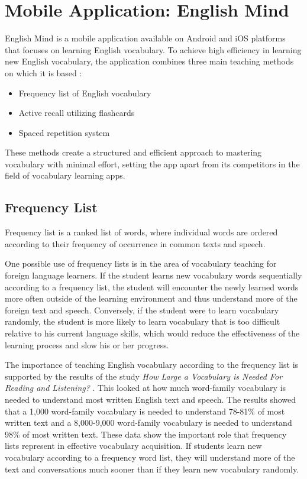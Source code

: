 \chapter{Mobile Application: English Mind}
\label{chap:mobile-application-english-mind}

English Mind is a mobile application available on Android \cite{cite:english_mind_play_store} and iOS \cite{cite:english_mind_app_store} platforms that focuses on learning English vocabulary. To achieve high efficiency in learning new English vocabulary, the application combines three main teaching methods on which it is based \cite{cite:english_mind_website}:

\begin{itemize}
    \item Frequency list of English vocabulary
    \item Active recall utilizing flashcards
    \item Spaced repetition system
\end{itemize}

These methods create a structured and efficient approach to mastering vocabulary with minimal effort, setting the app apart from its competitors in the field of vocabulary learning apps.

\section{Frequency List}

Frequency list is a ranked list of words, where individual words are ordered according to their frequency of occurrence in common texts and speech. 

One possible use of frequency lists is in the area of vocabulary teaching for foreign language learners. If the student learns new vocabulary words sequentially according to a frequency list, the student will encounter the newly learned words more often outside of the learning environment and thus understand more of the foreign text and speech. Conversely, if the student were to learn vocabulary randomly, the student is more likely to learn vocabulary that is too difficult relative to his current language skills, which would reduce the effectiveness of the learning process and slow his or her progress.

The importance of teaching English vocabulary according to the frequency list is supported by the results of the study \textit{How Large a Vocabulary is Needed For Reading and Listening?} \cite{cite:nation2006_how_large_vocabulary_is_needed}. This looked at how much word-family vocabulary is needed to understand most written English text and speech. The results showed that a 1,000 word-family vocabulary is needed to understand 78-81\% of most written text and a 8,000-9,000 word-family vocabulary is needed to understand 98\% of most written text. These data show the important role that frequency lists represent in effective vocabulary acquisition. If students learn new vocabulary according to a frequency word list, they will understand more of the text and conversations much sooner than if they learn new vocabulary randomly.

